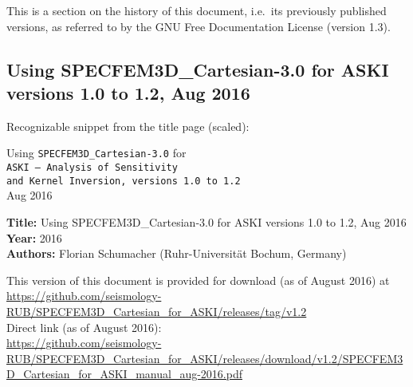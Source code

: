 
%
%
%
This is a section on the history of this document, i.e.\ its previously published versions, as referred to by
the GNU Free Documentation License (version 1.3).

\subsection*{Using SPECFEM3D\_Cartesian-3.0 for ASKI versions 1.0 to 1.2, Aug 2016}

Recognizable snippet from the title page (scaled):

\begin{center}
  {\large Using} {\tt \LARGE SPECFEM3D\_Cartesian-3.0} {\large for} \\ {\tt {\LARGE ASKI} {\rm--} {\LARGE A}{\small nalysis of} {\LARGE S}{\small ensitivity \\ and} {\LARGE\tt K}{\small ernel} {\LARGE\tt I}{\small nversion, versions 1.0 to 1.2}}\\Aug 2016
\end{center}

{\bf Title: } Using SPECFEM3D\_Cartesian-3.0 for ASKI versions 1.0 to 1.2, Aug 2016\\
{\bf Year: } 2016\\
{\bf Authors: } Florian Schumacher (Ruhr-Universit\"at Bochum, Germany)

This version of this document is provided for download (as of August 2016) at\\
\url{https://github.com/seismology-RUB/SPECFEM3D_Cartesian_for_ASKI/releases/tag/v1.2}\\
Direct link (as of August 2016):\\
\url{https://github.com/seismology-RUB/SPECFEM3D_Cartesian_for_ASKI/releases/download/v1.2/SPECFEM3D_Cartesian_for_ASKI_manual_aug-2016.pdf}


